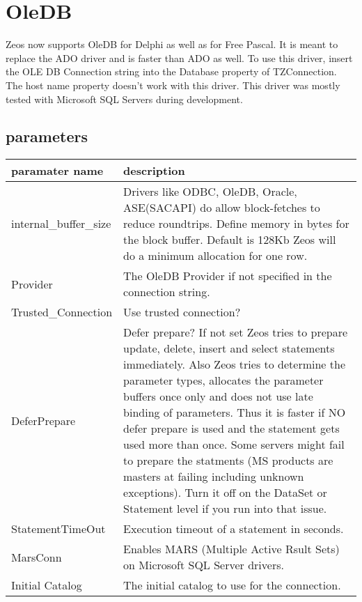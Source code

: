 \documentclass[a4paper,12pt,oneside]{report}
\begin{document}
\section{OleDB}
Zeos now supports OleDB for Delphi as well as for Free Pascal.
It is meant to replace the ADO driver and is faster than ADO as well.
To use this driver, insert the OLE DB Connection string into the Database property of TZConnection.
The host name property doesn't work with this driver.
This driver was mostly tested with Microsoft SQL Servers during development.

\subsection{parameters}

\begin{tabularx}{\textwidth}{lX}
    paramater name & description \\ \hline
		internal\_buffer\_size & 
		  Drivers like ODBC, OleDB, Oracle, ASE(SACAPI) do allow block-fetches to reduce roundtrips.
      Define memory in bytes for the block buffer.
			Default is 128Kb
      Zeos will do a minimum allocation for one row. \\
		Provider &
		  The OleDB Provider if not specified in the connection string. \\
		Trusted\_Connection &
		  Use trusted connection? \\
		DeferPrepare &
      Defer prepare? If not set Zeos tries to prepare update, delete, insert and select statements immediately.
      Also Zeos tries to determine the parameter types, allocates the parameter buffers once only and does not use late binding of parameters.
			Thus it is faster if NO defer prepare is used and the statement gets used more than once.
      Some servers might fail to prepare the statments (MS products are masters at failing including unknown exceptions).
			Turn it off on the DataSet or Statement level if you run into that issue. \\
		StatementTimeOut &
		  Execution timeout of a statement in seconds. \\
		MarsConn &
		  Enables MARS (Multiple Active Rsult Sets) on Microsoft SQL Server drivers. \\
		Initial Catalog &
		  The initial catalog to use for the connection.
\end{tabularx}
\end{document}
